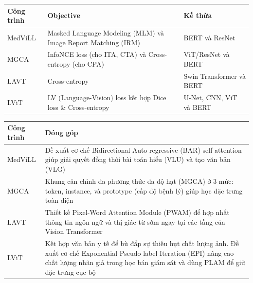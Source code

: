 \begin{frame}{\secname}
    \begin{table}
        \begin{tabular}{p{2cm}|p{4cm}|p{4cm}}
            \toprule
            Công trình & Objective & Kế thừa \\
            \midrule
            \cite{moon_multi-modal_2021} MedViLL & Masked Language Modeling (MLM) và Image Report Matching (IRM) & BERT và ResNet \\
            \cite{wang_multi-granularity_2022} MGCA & InfoNCE loss (cho ITA, CTA) và Cross-entropy (cho CPA) & ViT/ResNet và BERT \\
            \cite{yang_lavt_2021} LAVT & Cross-entropy & Swin Transformer và BERT \\
            \cite{li_lvit_2023} LViT & LV (Language-Vision) loss kết hợp Dice loss \& Cross-entropy & U-Net, CNN, ViT và BERT 
        \end{tabular}
    \end{table}
\end{frame}

\begin{frame}{\secname}
    \begin{table}
        \begin{tabular}{p{2cm}|p{8cm}}
            \toprule
            Công trình & Đóng góp \\
            \midrule
            \cite{moon_multi-modal_2021} MedViLL & Đề xuất cơ chế Bidirectional Auto-regressive (BAR) self-attention giúp giải quyết đồng thời bài toán hiểu (VLU) và tạo văn bản (VLG) \\
            \cite{wang_multi-granularity_2022} MGCA & Khung căn chỉnh đa phương thức đa độ hạt (MGCA) ở 3 mức: token, instance, và prototype (cấp độ bệnh lý) giúp học đặc trưng toàn diện \\
            \cite{yang_lavt_2021} LAVT & Thiết kế Pixel-Word Attention Module (PWAM) để hợp nhất thông tin ngôn ngữ và thị giác từ sớm ngay tại các tầng của Vision Transformer \\
            \cite{li_lvit_2023} LViT & Kết hợp văn bản y tế để bù đắp sự thiếu hụt chất lượng ảnh. Đề xuất cơ chế Exponential Pseudo label Iteration (EPI) nâng cao chất lượng nhãn giả trong học bán giám sát và dùng PLAM để giữ đặc trưng cục bộ
        \end{tabular}
    \end{table}
\end{frame}


